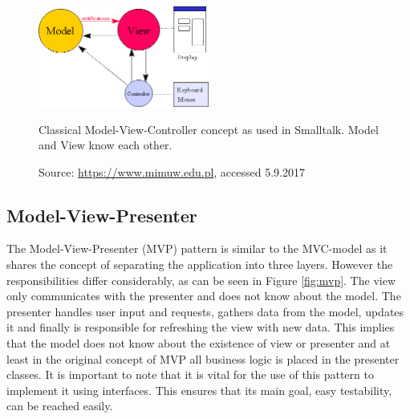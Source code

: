 \begin{figure}[htbp]
	\centering
	\label{fig:mvc-smalltalk}
	
	\includegraphics[width=0.5\textwidth]{./content/pictures/mvc-smalltalk.jpg}
	\caption{Classical Model-View-Controller concept as used in Smalltalk. Model and View know each other.}
	\caption*{Source: \href{https://www.mimuw.edu.pl/\~sl/teaching/00\_01/Delfin\_EC/Overviews/MVC.htm}{https://www.mimuw.edu.pl}, accessed 5.9.2017}
\end{figure}

\subsection{Model-View-Presenter}
The Model-View-Presenter (MVP) pattern is similar to the MVC-model as it shares the concept of separating the application into three layers. However the responsibilities differ considerably, as can be seen in Figure \ref{fig:mvp}. The view only communicates with the presenter and does not know about the model. The presenter handles user input and requests, gathers data from the model, updates it and finally is responsible for refreshing the view with new data. This implies that the model does not know about the existence of view or presenter and at least in the original concept of MVP all business logic is placed in the presenter classes. It is important to note that it is vital for the use of this pattern to implement it using interfaces. This ensures that its main goal, easy testability, can be reached easily. 

